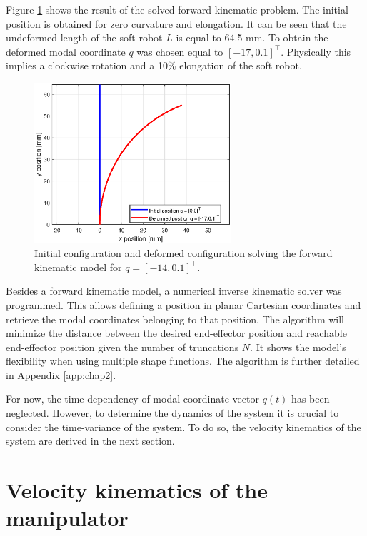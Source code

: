 Figure \ref{fig1:forward_kinematic} shows the result of the solved forward kinematic problem. The initial position is obtained for zero curvature and elongation. It can be seen that the undeformed length of the soft robot $L$ is equal to 64.5 mm. To obtain the deformed modal coordinate $q$ was chosen equal to $[-17,0.1]^\top$. Physically this implies a clockwise rotation and a 10\% elongation of the soft robot.


\begin{figure}[H]
    \centering
    \includegraphics[width = 0.65\textwidth]{Figures/Chapter2/fkin1701.eps}
    \caption{Initial configuration and deformed configuration solving the forward kinematic model for $q = [-14,0.1]^\top$.}
    \label{fig1:forward_kinematic}
\end{figure}



Besides a forward kinematic model, a numerical inverse kinematic solver was programmed. This allows defining a position in planar Cartesian coordinates and retrieve the modal coordinates belonging to that position. The algorithm will minimize the distance between the desired end-effector position and reachable end-effector position given the number of truncations $N$. It shows the model's flexibility when using multiple shape functions. The algorithm is further detailed in Appendix \ref{app:chap2}. 

For now, the time dependency of modal coordinate vector $q(t)$ has been neglected. However, to determine the dynamics of the system it is crucial to consider the time-variance of the system. To do so, the velocity kinematics of the system are derived in the next section.


\section{Velocity kinematics of the manipulator}

